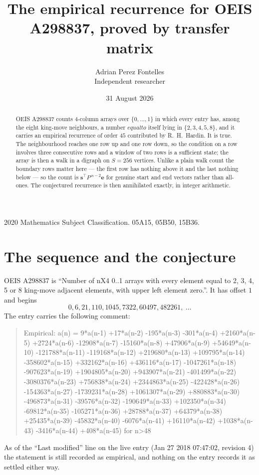 \documentclass[11pt,a4paper]{article}
\title{The empirical recurrence for OEIS A298837, proved by transfer matrix}
\author{Adrian Perez Fontelles\\ \small Independent researcher}
\date{31 August 2026}
\theoremstyle{plain}
\theoremstyle{definition}
\begin{document}
\maketitle

\begin{abstract}
OEIS A298837 counts $4$-column arrays over $\{0,\dots,1\}$ in which every entry has,
among the eight king-move neighbours, a number $equal to$ itself lying in $\{2,3,4,5,8\}$, and it carries an empirical
recurrence of order $45$ contributed by R.~H.~Hardin. It is true. The neighbourhood
reaches one row up and one row down, so the condition on a row involves three consecutive
rows and a window of two rows is a sufficient state; the array is then a walk in a digraph
on $S=256$ vertices. Unlike a plain walk count the boundary rows matter here --- the first
row has nothing above it and the last nothing below --- so the count is
$\mathbf{s}^{\!\top}P^{\,n-2}\mathbf{e}$ for genuine start and end vectors rather than
all-ones. The conjectured recurrence is then annihilated exactly, in integer arithmetic.
\end{abstract}

\noindent\small 2020 Mathematics Subject Classification. 05A15, 05B50, 15B36.\normalsize

\section{The sequence and the conjecture}

OEIS A298837 is ``Number of nX4 0..1 arrays with every element equal to 2, 3, 4, 5 or 8 king-move adjacent elements, with upper left element zero.''. It has offset
$1$ and begins
\[
0, 6, 21, 110, 1045, 7322, 60497, 482261,\ \dots
\]
The entry carries the following comment:
\begin{quote}\small
Empirical: a(n) = 9*a(n-1) +17*a(n-2) -195*a(n-3) -301*a(n-4) +2160*a(n-5) +2724*a(n-6) -12908*a(n-7) -15160*a(n-8) +47906*a(n-9) +54649*a(n-10) -121788*a(n-11) -119168*a(n-12) +219680*a(n-13) +109795*a(n-14) -358602*a(n-15) +332162*a(n-16) +436116*a(n-17) -1047261*a(n-18) -907623*a(n-19) +1904805*a(n-20) +943907*a(n-21) -401499*a(n-22) -3080376*a(n-23) +756838*a(n-24) +2344863*a(n-25) -422428*a(n-26) -154363*a(n-27) -1739231*a(n-28) +1061307*a(n-29) +880883*a(n-30) -496873*a(n-31) -39576*a(n-32) -190649*a(n-33) +102350*a(n-34) -69812*a(n-35) -105271*a(n-36) +28788*a(n-37) +64379*a(n-38) +25435*a(n-39) -45832*a(n-40) -6076*a(n-41) +16110*a(n-42) +1038*a(n-43) -3416*a(n-44) +408*a(n-45) for n>48
\end{quote}
As of the ``Last modified'' line on the live entry (Jan 27 2018 07:47:02, revision
4) the statement is still recorded as empirical, and nothing on the entry
records it as settled either way.
\end{document}
